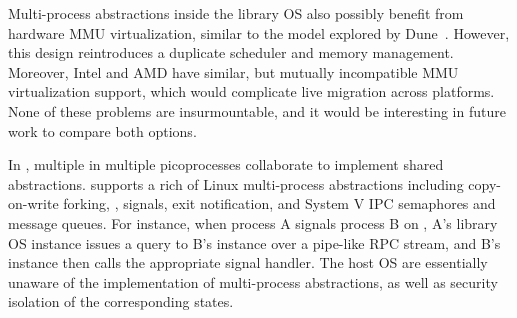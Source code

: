 Multi-process abstractions
inside the library OS also possibly benefit from
hardware MMU virtualization, similar to
the model explored by Dune~\cite{belay12dune}.
However, this design reintroduces a duplicate scheduler and memory management.
Moreover, Intel and AMD have similar, but mutually incompatible MMU virtualization support,
which would complicate live migration across platforms.
None of these problems are insurmountable, and it would be interesting in future
work to compare both options.


In \graphene{}, multiple \liboses{} in multiple picoprocesses collaborate to implement shared abstractions. \graphene{} supports a rich of Linux multi-process abstractions including copy-on-write forking, , signals, exit notification, and System V IPC semaphores and message queues.
For instance, when process A signals process B on \graphene{}, A's library OS instance issues a query to B's instance over a pipe-like
RPC stream, and B's instance then calls the appropriate signal handler.
The host OS are essentially unaware of the implementation
of multi-process abstractions,
as well as security isolation of the corresponding states.





